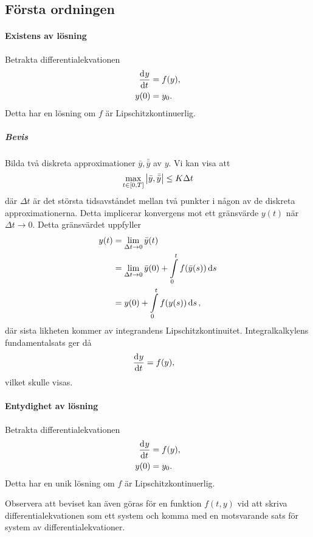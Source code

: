 \subsection{Första ordningen}

\paragraph{Existens av lösning}
Betrakta differentialekvationen
\begin{align*}
	\dv[]{y}{t} (t) &= f(y), \\
	y(0)            &= y_0.
\end{align*}
Detta har en lösning om $f$ är Lipschitzkontinuerlig.

\subparagraph{Bevis}
Bilda två diskreta approximationer $\bar{y}, \bar{\bar{y}}$ av $y$. Vi kan visa att
\begin{align*}
	\max\limits_{t\in [0, T]}\abs{\bar{y}, \bar{\bar{y}}}\leq K\Delta t
\end{align*}
där $\Delta t$ är det största tidsavståndet mellan två punkter i någon av de diskreta approximationerna. Detta implicerar konvergens mot ett gränsvärde $y(t)$ när $\Delta t\to 0$. Detta gränsvärdet uppfyller
\begin{align*}
	y(t) &= \lim\limits_{\Delta t\to 0}\bar{y}(t) \\
	     &= \lim\limits_{\Delta t\to 0}\bar{y}(0) + \int\limits_{0}^{t}f(\bar{y}(s))\dd{s} \\
	     &= y(0) + \int\limits_{0}^{t}f(y(s))\dd{s},
\end{align*}
där sista likheten kommer av integrandens Lipschitzkontinuitet. Integralkalkylens fundamentalsats ger då
\begin{align*}
	\dv[]{y}{t} (t) &= f(y),
\end{align*}
vilket skulle visas.

\paragraph{Entydighet av lösning}
Betrakta differentialekvationen
\begin{align*}
	\dv[]{y}{t} (t) &= f(y), \\
	y(0)            &= y_0.
\end{align*}
Detta har en unik lösning om $f$ är Lipschitzkontinuerlig.

Observera att beviset kan även göras för en funktion $f(t, y)$ vid att skriva differentialekvationen som ett system och komma med en motsvarande sats för system av differentialekvationer.

